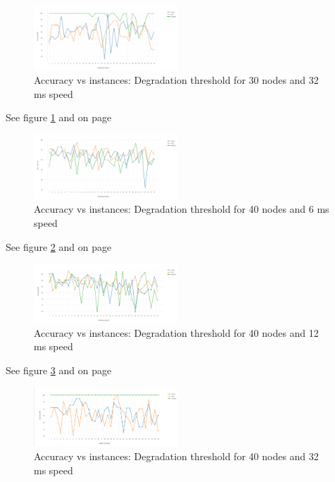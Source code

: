 \documentclass[letterpaper, 10 pt, conference]{ieeeconf}  %
\begin{document}
\begin{figure}[H]
\includegraphics[width=0.48\textwidth]{30Nodes32accuracy1}
\caption{Accuracy vs instances: Degradation threshold for 30 nodes and 32 ms speed}
\label{fig:30Nodes32accuracy}
\end{figure}

See figure \ref{fig:30Nodes32accuracy} and on page \pageref{fig:30Nodes32accuracy}






\begin{figure}[H]
\includegraphics[width=0.48\textwidth]{40Nodes06accuracy}
\caption{Accuracy vs instances: Degradation threshold for 40 nodes and 6 ms speed}
\label{fig:40Nodes06accuracy}
\end{figure}

See figure \ref{fig:40Nodes06accuracy} and on page \pageref{fig:40Nodes06accuracy}

\begin{figure}[H]
\includegraphics[width=0.48\textwidth]{40Nodes12accuracy.png}
\caption{Accuracy vs instances: Degradation threshold for 40 nodes and 12 ms speed}
\label{fig:40Nodes12accuracy}
\end{figure}

See figure \ref{fig:40Nodes12accuracy} and on page \pageref{fig:40Nodes12accuracy}



\begin{figure}[H]
\includegraphics[width=0.48\textwidth]{40Nodes32accuracy}
\caption{Accuracy vs instances: Degradation threshold for 40 nodes and 32 ms speed}
\label{fig:40Nodes32accuracy}
\end{figure}
\end{document}
